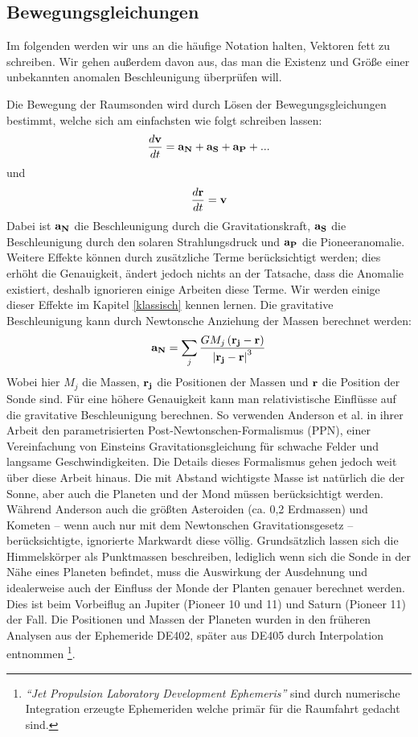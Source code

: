 
\subsection{Bewegungsgleichungen}
Im folgenden werden wir uns an die häufige Notation halten, Vektoren fett zu schreiben. Wir gehen außerdem davon aus, das man die Existenz und Größe einer unbekannten anomalen Beschleunigung überprüfen will.

Die Bewegung der Raumsonden wird durch Lösen der Bewegungsgleichungen bestimmt, welche sich am einfachsten wie folgt schreiben lassen:
\begin{equation}
\frac{d{\bf v}}{dt}={\bf a_N} + {\bf a_S} + {\bf a_P} + ...
\end{equation}
und
\begin{equation}
\frac{d{\bf r}}{dt}={\bf v}
\end{equation}
Dabei ist $\bf a_N$ die Beschleunigung durch die Gravitationskraft, $\bf a_S$ die Beschleunigung durch den solaren Strahlungsdruck und $\bf a_P$ die Pioneeranomalie. Weitere Effekte können durch zusätzliche Terme berücksichtigt werden; dies erhöht die Genauigkeit, ändert jedoch nichts an der Tatsache, dass die Anomalie existiert, deshalb ignorieren einige Arbeiten diese Terme. Wir werden einige dieser Effekte im Kapitel \ref{klassisch} kennen lernen.
Die gravitative Beschleunigung kann durch Newtonsche Anziehung der Massen berechnet werden:
\begin{equation}
{\bf a_N} = \sum_j \frac{GM_j\left({\bf r_j}-{\bf r}\right)}{\left| {\bf r_j}-{\bf r} \right|^3}
\end{equation}
Wobei hier $M_j$ die Massen, $\bf r_j$ die Positionen der Massen und $\bf r$ die Position der Sonde sind.
Für eine höhere Genauigkeit kann man relativistische Einflüsse auf die gravitative Beschleunigung berechnen. So verwenden Anderson et al. in ihrer Arbeit den parametrisierten Post-Newtonschen-Formalismus (PPN), einer Vereinfachung von Einsteins Gravitationsgleichung für schwache Felder und langsame Geschwindigkeiten.
Die Details dieses Formalismus gehen jedoch weit über diese Arbeit hinaus.
Die mit Abstand wichtigste Masse ist natürlich die der Sonne, aber auch die Planeten und der Mond müssen berücksichtigt werden.
Während Anderson\cite{Anderson2002} auch die größten Asteroiden (ca. 0,2 Erdmassen) und Kometen – wenn auch nur mit dem Newtonschen Gravitationsgesetz – berücksichtigte, ignorierte Markwardt diese völlig.
Grundsätzlich lassen sich die Himmelskörper als Punktmassen beschreiben, lediglich wenn sich die Sonde in der Nähe eines Planeten befindet, muss die Auswirkung der Ausdehnung und idealerweise auch der Einfluss der Monde der Planten genauer berechnet werden. Dies ist beim Vorbeiflug an Jupiter (Pioneer 10 und 11) und Saturn (Pioneer 11) der Fall.
Die Positionen und Massen der Planeten wurden in den früheren Analysen aus der Ephemeride
DE402, später aus DE405 durch Interpolation entnommen
\footnote{\textit{``Jet Propulsion Laboratory Development Ephemeris''} sind durch
numerische Integration erzeugte Ephemeriden welche primär für die Raumfahrt gedacht sind.}\cite{Anderson2002}.


